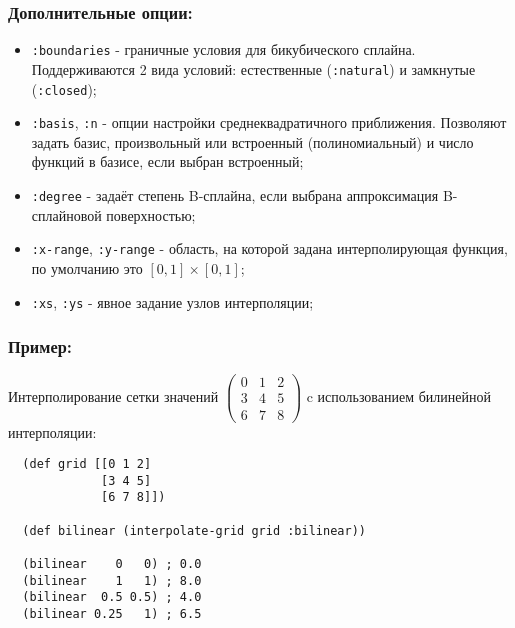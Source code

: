 \subsubsection{Дополнительные опции:}

\begin{itemize}
\item \texttt{:boundaries} - граничные условия для бикубического сплайна. Поддерживаются 2 вида условий: естественные (\texttt{:natural})
                             и замкнутые (\texttt{:closed});
\item \texttt{:basis}, \texttt{:n} - опции настройки среднеквадратичного приближения. Позволяют задать базис, произвольный или встроенный (полиномиальный) и число функций в базисе, если выбран встроенный;
\item \texttt{:degree} - задаёт степень B-сплайна, если выбрана аппроксимация B-сплайновой поверхностью;
\item \texttt{:x-range}, \texttt{:y-range} - область, на которой задана интерполирующая функция, по умолчанию это $[0, 1] \times [0, 1]$;
\item \texttt{:xs}, \texttt{:ys} - явное задание узлов интерполяции;
\end{itemize}

\subsubsection{Пример:}

Интерполирование сетки значений $\begin{pmatrix} 0 & 1 & 2 \\ 3 & 4 & 5 \\ 6 & 7 & 8 \end{pmatrix}$ c использованием билинейной интерполяции:

\begin{verbatim}
  (def grid [[0 1 2]
             [3 4 5]
             [6 7 8]])

  (def bilinear (interpolate-grid grid :bilinear))

  (bilinear    0   0) ; 0.0
  (bilinear    1   1) ; 8.0
  (bilinear  0.5 0.5) ; 4.0
  (bilinear 0.25   1) ; 6.5
\end{verbatim}




